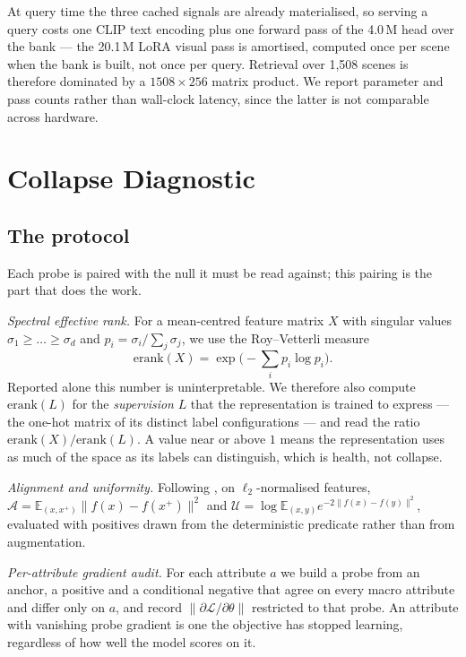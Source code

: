 \documentclass[10pt,twocolumn,letterpaper]{article}
\begin{document}
At query time the three cached signals are already materialised, so serving
a query costs one CLIP text encoding plus one forward pass of the 4.0\,M
head over the bank --- the 20.1\,M LoRA visual pass is amortised, computed
once per scene when the bank is built, not once per query. Retrieval over
1{,}508 scenes is therefore dominated by a $1508\times256$ matrix product.
We report parameter and pass counts rather than wall-clock latency, since
the latter is not comparable across hardware.

\section{Collapse Diagnostic}
\label{sec:diagnostic}

\subsection{The protocol}
Each probe is paired with the null it must be read against; this pairing is
the part that does the work.

\noindent\emph{Spectral effective rank.} For a mean-centred feature matrix
$X$ with singular values $\sigma_1\!\ge\!\dots\!\ge\!\sigma_d$ and
$p_i=\sigma_i/\sum_j\sigma_j$, we use the Roy--Vetterli measure
\cite{erank}
\begin{equation}
\mathrm{erank}(X)=\exp\Big(-\textstyle\sum_i p_i\log p_i\Big).
\end{equation}
Reported alone this number is uninterpretable. We therefore also compute
$\mathrm{erank}(L)$ for the \emph{supervision} $L$ that the representation
is trained to express --- the one-hot matrix of its distinct label
configurations --- and read the ratio $\mathrm{erank}(X)/\mathrm{erank}(L)$.
A value near or above $1$ means the representation uses as much of the space
as its labels can distinguish, which is health, not collapse.

\noindent\emph{Alignment and uniformity.} Following \cite{wangisola}, on
$\ell_2$-normalised features,
$\mathcal{A}=\mathbb{E}_{(x,x^{+})}\|f(x)-f(x^{+})\|^{2}$ and
$\mathcal{U}=\log\mathbb{E}_{(x,y)}e^{-2\|f(x)-f(y)\|^{2}}$, evaluated with
positives drawn from the deterministic predicate rather than from
augmentation.

\noindent\emph{Per-attribute gradient audit.} For each attribute $a$ we
build a probe from an anchor, a positive and a conditional negative that
agree on every macro attribute and differ only on $a$, and record
$\|\partial\mathcal{L}/\partial\theta\|$ restricted to that probe. An
attribute with vanishing probe gradient is one the objective has stopped
learning, regardless of how well the model scores on it.
\end{document}
